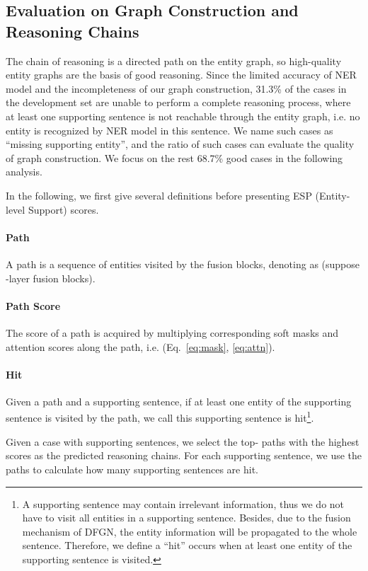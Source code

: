 \documentclass[11pt,a4paper]{article}
\newcommand{\method}{DFGN\xspace}
\begin{document}
\subsection{Evaluation on Graph Construction and Reasoning Chains}
The chain of reasoning is a directed path on the entity graph, so high-quality entity graphs are the basis of good reasoning. 
Since the limited accuracy of NER model and the incompleteness of our graph construction, 31.3\% of the cases in the development set are unable to perform a complete reasoning process, where at least one supporting sentence is not reachable through the entity graph, i.e. no entity is recognized by NER model in this sentence. 
We name such cases as ``missing supporting entity'', and the ratio of such cases can evaluate the quality of graph construction.
We focus on the rest 68.7\% good cases in the following analysis.

In the following, we first give several definitions before presenting ESP (Entity-level Support) scores.

\paragraph{Path} A path is a sequence of entities visited by the fusion blocks, denoting as  (suppose -layer fusion blocks).

\paragraph{Path Score} The score of a path is acquired by multiplying corresponding soft masks and attention scores along the path, i.e.  (Eq.~\eqref{eq:mask}, \eqref{eq:attn}).

\paragraph{Hit} Given a path and a supporting sentence, if at least one entity of the supporting sentence is visited by the path, we call this supporting sentence is hit\footnote{A supporting sentence may contain irrelevant information, thus we do not have to visit all entities in a supporting sentence. Besides, due to the fusion mechanism of \method, the entity information will be propagated to the whole sentence. Therefore, we define a ``hit'' occurs when at least one entity of the supporting sentence is visited.}.

Given a case with  supporting sentences, we select the top- paths with the highest scores as the predicted reasoning chains. For each supporting sentence, we use the  paths to calculate how many supporting sentences are hit. 
\end{document}
